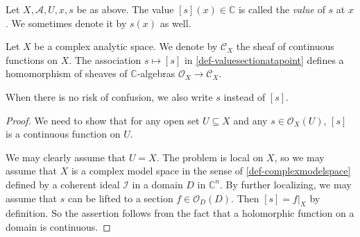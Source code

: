 \begin{definition}\label{def-valuesectionatapoint}
    Let $X,\mathcal{A},U,x,s$ be as above. The value $[s](x)\in \mathbb{C}$ is called the \emph{value} of $s$ at $x$. We sometimes denote it by $s(x)$ as well.
\end{definition}

\begin{lemma}
    Let $X$ be a complex analytic space. We denote by $\mathcal{C}_X$ the sheaf of continuous functions on $X$. 
    The association $s\mapsto [s]$ in \cref{def-valuesectionatapoint} defines a homomorphism of sheaves of $\mathbb{C}$-algebras $\mathcal{O}_X\rightarrow \mathcal{C}_X$. 
\end{lemma}
When there is no risk of confusion, we also write $s$ instead of $[s]$.
\begin{proof}
    We need to show that for any open set $U\subseteq X$ and any $s\in \mathcal{O}_X(U)$, $[s]$ is a continuous function on $U$. 
    
    We may clearly assume that $U=X$. The problem is local on $X$, so we may assume that $X$ is a complex model space in the sense of \cref{def-complexmodelspace} defined by a coherent ideal $\mathcal{I}$ in a domain $D$ in $\mathbb{C}^n$. By further localizing, we may assume that $s$ can be lifted to a section $f\in\mathcal{O}_D(D)$. Then $[s]=f|_X$ by definition. So the assertion follows from the fact that a holomorphic function on a domain is continuous.
\end{proof}

